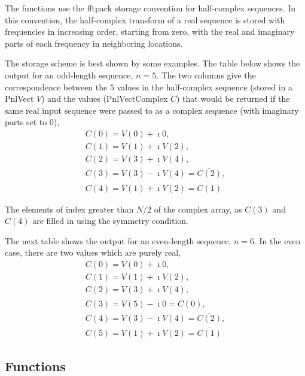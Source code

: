 The functions use the fftpack storage convention for half-complex sequences.
In this convention, the half-complex transform of a real sequence is stored
with frequencies in increasing order, starting from zero, with the real and
imaginary parts of each frequency in neighboring locations.

The storage scheme is best shown by some examples. The table below shows the
output for an odd-length sequence, $n=5$.  The two columns give the
correspondence between the $5$ values in the half-complex sequence (stored in
a PnlVect $V$) and the values (PnlVectComplex $C$) that would be returned if
the same real input sequence were passed to  as a complex
sequence (with imaginary parts set to 0),
\begin{equation}
  \begin{array}{l}
    C(0) =  V(0) + \imath 0, \\
    C(1) =  V(1) + \imath V(2), \\
    C(2) =  V(3) + \imath V(4), \\
    C(3) = V(3) - \imath V(4)=  \overline{C(2)} , \\
    C(4) = V(1) + \imath V(2)=  \overline{C(1)}
  \end{array}
\end{equation}

The elements of index greater than $N/2$ of the complex array, as $C(3)$ and
$C(4)$ are filled in using the symmetry condition.

The next table shows the output for an even-length sequence, $n=6$.
In the even case, there are two values which are purely real,
\begin{equation}
  \begin{array}{l}
    C(0) =  V(0) + \imath 0, \\
    C(1) =  V(1) + \imath V(2), \\
    C(2) =  V(3) + \imath V(4), \\
    C(3) = V(5) - \imath 0    =  \overline{C(0)} , \\
    C(4) = V(3) - \imath V(4) =  \overline{C(2)} , \\
    C(5) = V(1) + \imath V(2) =  \overline{C(1)}
  \end{array}
\end{equation}


\subsection{Functions}

